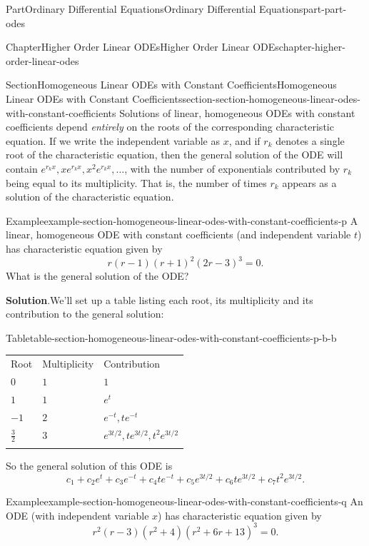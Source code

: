 \documentclass[twoside,10pt,]{book}
\newcommand{\blocktitlefont}{\relax}
\newcommand{\tabularfont}{\relax}
\numberwithin{equation}{part}
\newcommand{\hrulethick} {\noalign{\hrule height 0.11em}}
\begin{document}
\begin{partptx}{Part}{Ordinary Differential Equations}{}{Ordinary Differential Equations}{}{}{part-part-odes}
\begin{chapterptx}{Chapter}{Higher Order Linear ODEs}{}{Higher Order Linear ODEs}{}{}{chapter-higher-order-linear-odes}
\begin{sectionptx}{Section}{Homogeneous Linear ODEs with Constant Coefficients}{}{Homogeneous Linear ODEs with Constant Coefficients}{}{}{section-section-homogeneous-linear-odes-with-constant-coefficients}
Solutions of linear, homogeneous ODEs with constant coefficients depend \emph{entirely} on the roots of the corresponding characteristic equation. If we write the independent variable as \(x\), and if \(r_{k}\) denotes a single root of the characteristic equation, then the general solution of the ODE will contain \(e^{r_{k}x},xe^{r_{k}x},x^{2}e^{r_{k}x},\dots\), with the number of exponentials contributed by \(r_{k}\) being equal to its multiplicity. That is, the number of times \(r_{k}\) appears as a solution of the characteristic equation.%
\begin{example}{Example}{}{example-section-homogeneous-linear-odes-with-constant-coefficients-p}%
A linear, homogeneous ODE with constant coefficients (and independent variable \(t\)) has characteristic equation given by%
\begin{equation*}
r(r-1)(r+1)^{2}(2r-3)^{3} = 0.
\end{equation*}
What is the general solution of the ODE?%
\par\smallskip%
\noindent\textbf{\blocktitlefont Solution}.\hypertarget{solution-section-homogeneous-linear-odes-with-constant-coefficients-p-b}{}\quad{}We'll set up a table listing each root, its multiplicity and its contribution to the general solution:%
\begin{tableptx}{Table}{\textbf{}}{table-section-homogeneous-linear-odes-with-constant-coefficients-p-b-b}{}%
\centering%
{\tabularfont%
\begin{tabular}{lll}\hrulethick
Root&Multiplicity&Contribution\tabularnewline\hrulethick
\(0\)&\(1\)&\(1\)\tabularnewline\hrulethick
\(1\)&\(1\)&\(e^{t}\)\tabularnewline\hrulethick
\(-1\)&\(2\)&\(e^{-t},te^{-t}\)\tabularnewline\hrulethick
\(\frac{3}{2}\)&\(3\)&\(e^{3t/2},te^{3t/2},t^{2}e^{3t/2}\)\tabularnewline\hrulethick
\end{tabular}
}%
\end{tableptx}%
 So the general solution of this ODE is%
\begin{equation*}
c_{1}+c_{2}e^{t}+c_{3}e^{-t}+c_{4}te^{-t}+c_{5}e^{3t/2}+c_{6}te^{3t/2}+c_{7}t^{2}e^{3t/2}.
\end{equation*}
\end{example}
\begin{example}{Example}{}{example-section-homogeneous-linear-odes-with-constant-coefficients-q}%
An ODE (with independent variable \(x\)) has characteristic equation given by%
\begin{equation*}
r^{2}(r-3)(r^{2}+4)(r^{2}+6r+13)^{3}=0.
\end{equation*}

\end{example}
\end{sectionptx}
\end{chapterptx}
\end{partptx}
\end{document}
